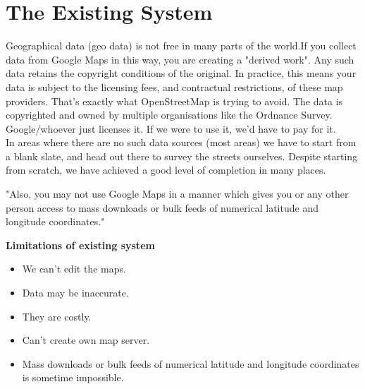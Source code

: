 \section{The Existing System}
Geographical data (geo data) is not free in many parts of the world.If you collect data from Google Maps in this way, you are creating a "derived work". Any such data retains the copyright conditions of the original. In practice, this means your data is subject to the licensing fees, and contractual restrictions, of these map providers. That's exactly what OpenStreetMap is trying to avoid. The data is copyrighted and owned by multiple organisations like the Ordnance Survey. Google/whoever just licenses it. If we were to use it, we'd have to pay for it.\\ 

In areas where there are no such data sources (most areas) we have to start from a blank slate, and head out there to survey the streets ourselves. Despite starting from scratch, we have achieved a good level of completion in many places.  

"Also, you may not use Google Maps in a manner which gives you or any other person access to mass downloads or bulk feeds of numerical latitude and longitude coordinates."

{\bf {Limitations of existing system }}
\begin{itemize}
\item We can't edit the maps.

\item Data may be inaccurate.

\item They are costly.

\item Can't create own map server.

\item Mass downloads or bulk feeds of numerical latitude and longitude coordinates is sometime impossible.
\end{itemize}


